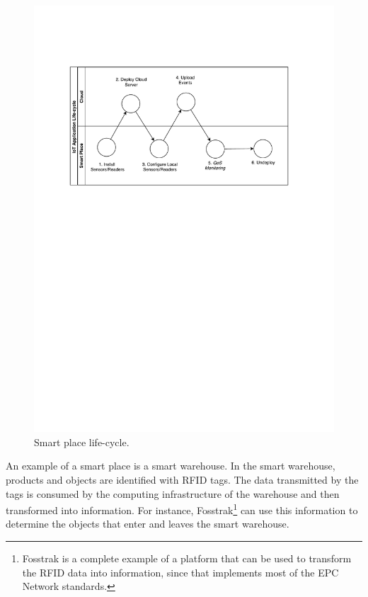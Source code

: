 \begin{figure}
  \centering
  \includegraphics[width=\textwidth]{images/life-cycle.pdf}
  \caption{Smart place life-cycle.}
  \label{fig:smartplace_lifecycle}
\end{figure}

An example of a smart place is a smart warehouse. In the smart warehouse, products and objects
are identified with RFID tags. The data transmitted by the tags is consumed by the computing
infrastructure of the warehouse and then transformed into information. For instance,
Fosstrak\footnote{ Fosstrak is a complete example of a platform that can be used to transform
the RFID data into information, since that implements most of the EPC Network standards.} can use
this information to determine the objects that enter and leaves the smart warehouse.

